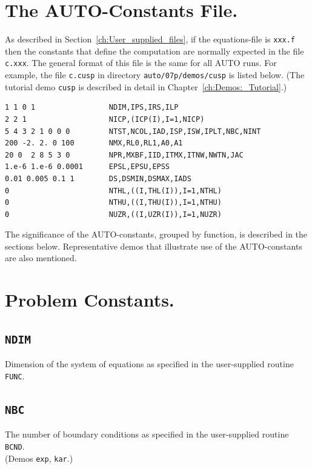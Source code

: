 \documentclass[12pt]{report}
\begin{document}
\section{ The {\cal AUTO}-Constants File.} \label{sec:The_AUTO_constants_file}
As described in Section~\ref{ch:User_supplied_files}, 
if the equations-file is {\tt xxx.f} 
then the constants that define the computation 
are normally expected in the file  {\tt c.xxx}.
The general format of this file is the same for all {\cal AUTO} runs.
For example, the file {\tt c.cusp} 
in directory {\tt auto/07p/demos/cusp} is listed below.
(The tutorial demo {\tt cusp} is described in detail in 
Chapter~\ref{ch:Demos:_Tutorial}.)  

\begin{verbatim}
1 1 0 1                 NDIM,IPS,IRS,ILP
2 2 1                   NICP,(ICP(I),I=1,NICP)
5 4 3 2 1 0 0 0         NTST,NCOL,IAD,ISP,ISW,IPLT,NBC,NINT
200 -2. 2. 0 100        NMX,RL0,RL1,A0,A1
20 0  2 8 5 3 0         NPR,MXBF,IID,ITMX,ITNW,NWTN,JAC
1.e-6 1.e-6 0.0001      EPSL,EPSU,EPSS
0.01 0.005 0.1 1        DS,DSMIN,DSMAX,IADS
0                       NTHL,((I,THL(I)),I=1,NTHL)
0                       NTHU,((I,THU(I)),I=1,NTHU)
0                       NUZR,((I,UZR(I)),I=1,NUZR)
\end{verbatim}

The significance of the {\cal AUTO}-constants, grouped by function, is 
described in the sections below. 
Representative demos that illustrate use of the {\cal AUTO}-constants
are also mentioned.

\section{ Problem Constants.} \label{sec:Problem_constants}
\subsection{\tt NDIM} \label{sec:NDIM}
 Dimension of the system of equations as specified in the user-supplied
 routine {\tt FUNC}.

\subsection{\tt NBC}  \label{sec:NBC}
 The number of boundary conditions as specified in the user-supplied
 routine {\tt BCND}. \\
(Demos {\tt exp}, {\tt kar}.)
\end{document}

